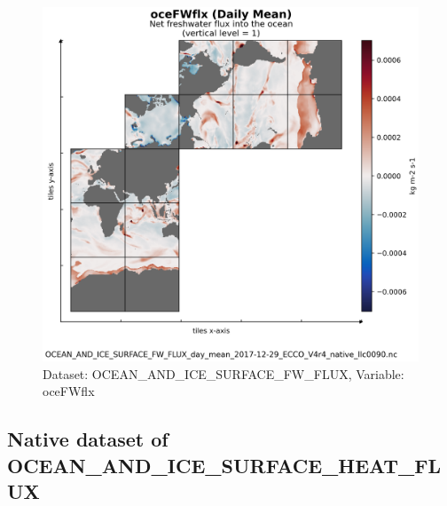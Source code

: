 \begin{figure}[H]
\centering
\includegraphics[scale=0.55]{../images/plots/v4r4/native_plots/Ocean_and_Sea-Ice_Surface_Freshwater_Fluxes/oceFWflx.png}
\caption{Dataset: OCEAN\_AND\_ICE\_SURFACE\_FW\_FLUX, Variable: oceFWflx}
\label{tab:table-OCEAN_AND_ICE_SURFACE_FW_FLUX_oceFWflx-Plot}
\end{figure}
\newpage
\subsection{Native dataset of OCEAN\_AND\_ICE\_SURFACE\_HEAT\_FLUX}
\newp
